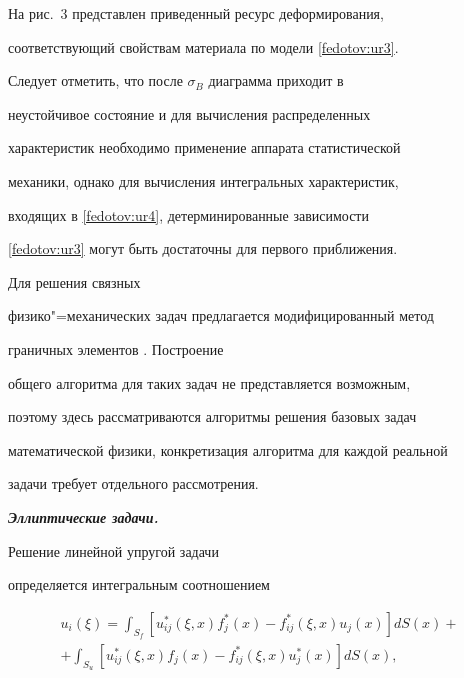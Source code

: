 На рис.~3 представлен приведенный ресурс деформирования,

соответствующий свойствам материала по модели \eqref{fedotov:ur3}.



Следует отметить, что после $\sigma _{B}$ диаграмма  приходит в

неустойчивое состояние и для вычисления распределенных

характеристик необходимо применение аппарата статистической

механики, однако для вычисления интегральных характеристик,

входящих в \eqref{fedotov:ur4}, детерминированные зависимости

\eqref{fedotov:ur3} могут быть достаточны для первого приближения.



\smallskip



 Для решения связных

физико"=механических задач предлагается модифицированный метод

граничных элементов  \cite{fed:bib:Fed1,fed:bib:Fed2}. Построение

общего алгоритма для таких задач не представляется возможным,

поэтому здесь рассматриваются алгоритмы решения базовых задач

математической физики, конкретизация алгоритма для каждой реальной

задачи требует отдельного рассмотрения.



\smallskip



\renewcommand{\bfdefault}{bx}



\textit{\textbf{Эллиптические задачи.}} \renewcommand{\bfdefault}{b}

 Решение линейной упругой задачи

определяется интегральным соотношением



\vspace{-3mm}



\begin{multline}

u_i (\xi)=\int _{S_f} \left[u_{ij}^* (\xi,x)f_j^*

(x)-f_{ij}^* (\xi ,x)u_j (x)\right]dS(x) +\\

+\int _{S_u}\left[u_{ij}^* (\xi ,x)f_j (x)-f_{ij}^* (\xi ,x)u_j^*

(x)\right]dS(x), \label{fedotov:ur5}

\end{multline}



